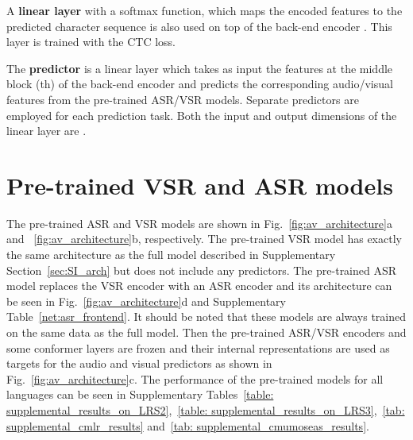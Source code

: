 \documentclass[twocolumn]{article}
\begin{document}
A \textbf{linear layer} with a softmax function, which maps the encoded features to the predicted character sequence is also used on top of the back-end encoder . This layer is trained with the CTC loss.

The \textbf{predictor} is a linear layer which takes as input the features at the middle block (th) of the back-end encoder and predicts the corresponding audio/visual features from the pre-trained ASR/VSR models. Separate predictors are employed for each prediction task. Both the input and output dimensions of the linear layer are .

\section{Pre-trained VSR and ASR models}
\label{sec:SI_VSR_ASR_Models}
The pre-trained ASR and VSR models are shown in Fig.~\ref{fig:av_architecture}a and ~\ref{fig:av_architecture}b, respectively. The pre-trained VSR model has exactly the same architecture as the full model described in Supplementary Section~\ref{sec:SI_arch} but does not include any predictors. The pre-trained ASR model replaces the VSR encoder with an ASR encoder and its architecture can be seen in Fig.~\ref{fig:av_architecture}d and Supplementary Table~\ref{net:asr_frontend}. It should be noted that these models are always trained on the same data as the full model. Then the pre-trained ASR/VSR encoders and some conformer layers are frozen and their internal representations are used as targets for the audio and visual predictors as shown in Fig.~\ref{fig:av_architecture}c. The performance of the pre-trained models for all languages can be seen in Supplementary Tables~\ref{table: supplemental_results_on_LRS2},~\ref{table: supplemental_results_on_LRS3},~\ref{tab: supplemental_cmlr_results} and~\ref{tab: supplemental_cmumoseas_results}.
\end{document}
